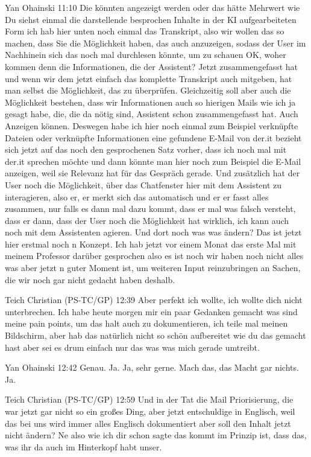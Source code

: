 Yan Ohainski   11:10
Die könnten angezeigt werden oder das hätte Mehrwert wie Du siehst einmal die darstellende besprochen Inhalte in der KI aufgearbeiteten Form ich hab hier unten noch einmal das Transkript, also wir wollen das so machen, dass Sie die Möglichkeit haben, das auch anzuzeigen, sodass der User im Nachhinein sich das noch mal durchlesen könnte, um zu schauen OK, woher kommen denn die Informationen, die der Assistent?
Jetzt zusammengefasst hat und wenn wir dem jetzt einfach das komplette Transkript auch mitgeben, hat man selbst die Möglichkeit, das zu überprüfen. Gleichzeitig soll aber auch die Möglichkeit bestehen, dass wir Informationen auch so hierigen Mails wie ich ja gesagt habe, die, die da nötig sind, Assistent schon zusammengefasst hat.
Auch Anzeigen können.
Deswegen habe ich hier noch einmal zum Beispiel verknüpfte Dateien oder verknüpfte Informationen eine gefundene E-Mail von der.it bezieht sich jetzt auf das noch den gesprochenen Satz vorher, dass ich noch mal mit der.it sprechen möchte und dann könnte man hier noch zum Beispiel die E-Mail anzeigen, weil sie Relevanz hat für das Gespräch gerade.
Und zusätzlich hat der User noch die Möglichkeit, über das Chatfenster hier mit dem Assistent zu interagieren, also er, er merkt sich das automatisch und er er fasst alles zusammen, nur falls es dann mal dazu kommt, dass er mal was falsch versteht, dass er dann, dass der User noch die Möglichkeit hat wirklich, ich kann auch noch mit dem Assistenten agieren.
Und dort noch was was ändern?
Das ist jetzt hier erstmal noch n Konzept. Ich hab jetzt vor einem Monat das erste Mal mit meinem Professor darüber gesprochen also es ist noch wir haben noch nicht alles was aber jetzt n guter Moment ist, um weiteren Input reinzubringen an Sachen, die wir noch gar nicht gedacht haben deshalb.

Teich Christian (PS-TC/GP)   12:39
Aber perfekt ich wollte, ich wollte dich nicht unterbrechen. Ich habe heute morgen mir ein paar Gedanken gemacht was sind meine pain points, um das halt auch zu dokumentieren, ich teile mal meinen Bildschirm, aber hab das natürlich nicht so schön aufbereitet wie du das gemacht hast aber sei es drum einfach nur das was was mich gerade umtreibt.

Yan Ohainski   12:42
Genau.
Ja.
Ja, sehr gerne.
Mach das, das Macht gar nichts.
Ja.

Teich Christian (PS-TC/GP)   12:59
Und in der Tat die Mail Priorisierung, die war jetzt gar nicht so ein großes Ding, aber jetzt entschuldige in Englisch, weil das bei uns wird immer alles Englisch dokumentiert aber soll den Inhalt jetzt nicht ändern? Ne also wie ich dir schon sagte das kommt im Prinzip ist, dass das, was ihr da auch im Hinterkopf habt unser.

